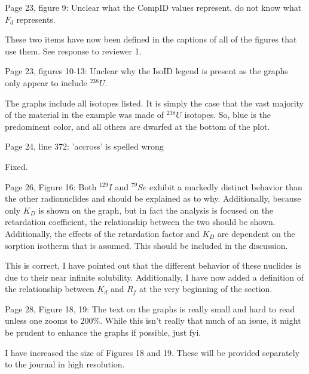 \documentclass[answers,12pt]{exam}
\begin{document}
\begin{questions}
\question Page 23, figure 9: Unclear what the CompID values represent, do not 
know what $F_d$ represents.  \begin{solution}
These two items have now been defined in the captions of all of the figures 
that use them. See response to reviewer 1.  \end{solution} 
 
\question Page  23,  figures  10-13:  Unclear  why  the  IsoID  legend  is  
present  as  the  graphs  only  appear  to  include  $^{238} U$.  
\begin{solution}
The graphs include all isotopes listed. It is simply the case that the vast 
        majority of the material in the example was made of $^{238}U$ isotopes.  
        So, blue is the predominent color, and all others are dwarfed at the 
        bottom of the plot.
\end{solution} 
 
\question Page 24, line 372: 'accross' is spelled wrong \begin{solution}
Fixed.
\end{solution} 
 
\question Page  26,  Figure  16:  Both  $^{129}I$  and  $^{79}Se$  exhibit  a  
markedly  distinct  behavior  than  the  other  radionuclides and  should  be  
explained  as  to  why.  Additionally,  because  only  $K_D$ is shown on the 
graph, but in fact the analysis  is  focused  on  the  retardation  
coefficient,  the  relationship  between  the  two  should  be  shown.  
Additionally,  the  effects  of  the  retardation  factor  and  $K_D$  are 
dependent on the sorption isotherm that is assumed. This should be included in 
the discussion.  
\begin{solution}
This is correct, I have pointed out that the different behavior of these 
        nuclides is due to their near infinite solubility. Additionally, I have 
        now added a definition of the relationship between $K_d$ and $R_f$ at 
        the very beginning of the section. 
\end{solution} 
 

\question Page 28, Figure 18, 19: The text on the graphs is really small and 
hard to read unless one zooms to 200\%.  While  this  isn't  really  that  much  
of  an  issue,  it  might  be  prudent  to  enhance  the  graphs  if  possible,  
just fyi.  \begin{solution}
I have increased the size of Figures 18 and 19.
        These will be provided separately to the journal in high resolution.  
\end{solution} 


\end{questions}
\end{document}
